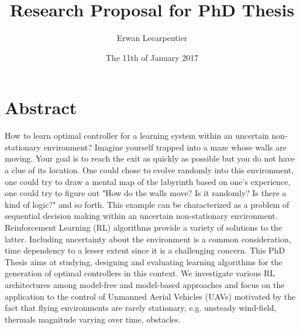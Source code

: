 \documentclass[]{article}
\begin{document}
\title{Research Proposal for PhD Thesis}
\author{Erwan Lecarpentier}
\date{The 11th of January 2017}

\maketitle


\section{Abstract}
How to learn optimal controller for a learning system within an uncertain non-stationary environment? Imagine yourself trapped into a maze whose walls are moving. Your goal is to reach the exit as quickly as possible but you do not have a clue of its location. One could chose to evolve randomly into this environment, one could try to draw a mental map of the labyrinth based on one's experience, one could try to figure out "How do the walls move? Is it randomly? Is there a kind of logic?" and so forth. This example can be characterized as a problem of sequential decision making within an uncertain non-stationary environment. Reinforcement Learning (RL) algorithms provide a variety of solutions to the latter. Including uncertainty about the environment is a common consideration, time dependency to a lesser extent since it is a challenging concern. This PhD Thesis aims at studying, designing and evaluating learning algorithms for the generation of optimal controllers in this context. We investigate various RL architectures among model-free and model-based approaches and focus on the application to the control of Unmanned Aerial Vehicles (UAVs) motivated by the fact that flying environments are rarely stationary, e.g. unsteady wind-field, thermals magnitude varying over time, obstacles.
\\

\end{document}
